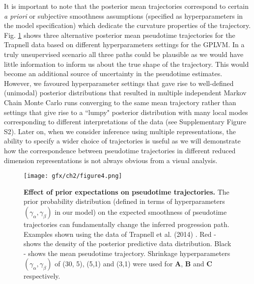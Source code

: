 It is important to note that the posterior mean trajectories correspond to certain \textit{a priori} or subjective smoothness assumptions (specified as hyperparameters in the model specification) which dedicate the curvature properties of the trajectory. Fig. \ref{fig:varygamma} shows three alternative posterior mean pseudotime trajectories for the Trapnell data based on different hyperparameters settings for the GPLVM. In a truly unsupervised scenario all three paths could be plausible as we would have little information to inform us about the true shape of the trajectory. This would become an additional source of uncertainty in the pseudotime estimates. However, we favoured hyperparameter settings that gave rise to well-defined (unimodal) posterior distributions that resulted in multiple independent Markov Chain Monte Carlo runs converging to the same mean trajectory rather than settings that give rise to a ``lumpy" posterior distribution with many local modes corresponding to different interpretations of the data (see Supplementary Figure S2). Later on, when we consider inference using multiple representations, the ability to specify a wider choice of trajectories is useful as we will demonstrate how the correspondence between pseudotime trajectories in different reduced dimension representations is not always obvious from a visual analysis.

\begin{figure}[h]

	\centering
	\texttt{[image: gfx/ch2/figure4.png]}
  \caption{{\bf Effect of prior expectations on pseudotime trajectories.}
      The prior probability distribution (defined in terms of hyperparameters $(\gamma_\alpha, \gamma_\beta)$ in our model) on the expected smoothness of pseudotime trajectories can fundamentally change the inferred progression path. Examples shown using the data of Trapnell et al. (2014) \cite{Trapnell2014}. Red - shows the density of the posterior predictive data distribution. Black - shows the mean pseudotime trajectory. Shrinkage hyperparameters $(\gamma_\alpha, \gamma_\beta)$ of (30, 5), (5,1) and (3,1) were used for \textbf{A}, \textbf{B} and \textbf{C} respectively.}
	\label{fig:varygamma}
\end{figure}

